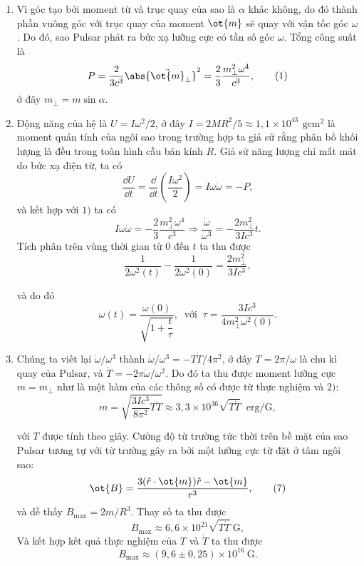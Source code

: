 \begin{loigiai}
\begin{enumerate}[1)]
 \item Vì góc tạo bởi moment từ và trục quay của sao là $\alpha$ khác không, do đó thành phần vuông góc với trục quay của moment $\ot{m}$ sẽ quay với vận tốc góc $\omega$. Do đó, sao Pulsar phát ra bức xạ lưỡng cực có tần số góc $\omega$. Tổng công suất là 
  \[P= \frac{2}{3c^3}\abs{{\ddot{\ot{m}}_{\perp}}}^2 = \frac{2}{3}\dfrac{m_{\perp}^2 \omega^4}{c^3}, \tag{1} \]
ở đây $m_{\perp} = m \sin \alpha $. 
  \item Động năng của hệ là $U= I\omega^2 /2$, ở đây $I= 2MR^2 /5 \approx 1,1\times 10^{43} \,~\mathrm{gcm}^2$ là moment quán tính của ngôi sao trong trường hợp ta giả sử rằng phân bố khối lượng là đều trong toàn hình cầu bán kính $R$. Giả sử năng lượng chỉ mất mát do bức xạ điện từ, ta có 
   \[\frac{\dd U}{\dd t} = \frac{\dd}{\dd t} \left( \frac{I\omega^2}{2}\right)= I\omega\dot{\omega} = -P, \tag{2} \] 
và kết hợp với $1)$ ta có
   \[I\omega \dot{\omega} = - \frac{2}{3} \frac{m_{\perp}^2 \omega^4 }{c^3} \Rightarrow \frac{\dot{\omega}}{\omega^3} = - \frac{2m_{\perp}^2}{3 I c^3}t . \tag{3} \]
Tích phân trên vùng thời gian từ $0$ đến $t$ ta thu được
   \[\frac{1}{2\omega^2(t)} - \frac{1}{2\omega^2(0)} = \frac{2m_{\perp}^2}{3Ic^3} ,\tag{4}\] 

và do đó
   \[\omega(t) =  \frac{\omega(0)}{\sqrt{1+\dfrac{t}{\tau}}}, \ \text{ với } \ \tau = \frac{3Ic^3}{4m_{\perp}^2 \omega^2(0)} . \tag{5} \] 

\item Chúng ta viết lại $\dot{\omega}/\omega^3$ thành $\dot{\omega}/\omega^3 = -T\dot{T}/4\pi^2$, ở đây $T= 2\pi/\omega$ là chu kì quay của Pulsar, và $\dot{T} = -2\pi \dot{\omega}/\omega^2$. Do đó ta thu được moment lưỡng cực $m= m_{\perp}$ như là một hàm của các thông số có được từ thực nghiệm và $2)$:
    \[ m = \sqrt{\frac{3Ic^3}{8\pi^2} T\dot{T}} \approx 3,3 \times 10^{36} \sqrt{T\dot{T}} \,\,~\mathrm{erg/G}, \tag{6} \]

với $T$ được tính theo giây. Cường độ từ trường tức thời trên bề mặt của sao Pulsar tương tự với từ trường gây ra bởi một lưỡng cực từ đặt ở tâm ngôi sao:
     \[\ot{B} = \frac{3({\hat{r}} \cdot \ot{m})\hat{r} - \ot{m}}{r^3}, \tag{7} \]
và dễ thấy $B_{\max} = 2m/R^3$. Thay số ta thu được 
      \[B_{\max} \approx 6,6 \times 10^{21} \sqrt{T\dot{T}} ~ \mathrm{G}, \tag{8} \]
Và kết hợp kết quả thực nghiệm của $T$ và $\dot{T}$ ta thu được 
     \[B_{\max} \approx (9,6\pm 0,25 ) \times 10^{16} ~\mathrm{G}. \tag{9} \]

\end{enumerate}
\end{loigiai}


